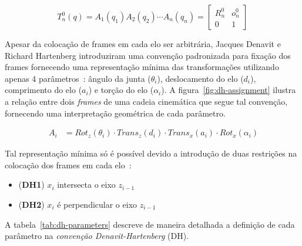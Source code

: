 \begin{equation}\label{eq:fkine}
    T^0_n(q) = A_1(q_1) A_2(q_2) \cdots A_n(q_n) = \begin{bmatrix}
        R^0_n & o^0_n \\
        0     & 1
    \end{bmatrix}
\end{equation}

Apesar da colocação de frames em cada elo ser arbitrária, Jacques Denavit e Richard Hartenberg
introduziram uma convenção padronizada para fixação dos frames fornecendo uma representação mínima das transformações 
utilizando apenas 4 parâmetros~\cite{denavit1955}: ângulo da junta  (\(\theta_i\)), deslocamento do elo (\(d_i\)), comprimento do elo (\(a_i\)) e 
torção do elo (\(\alpha_i\)). A figura~\ref{fig:dh-assignment} ilustra a relação entre dois \emph{frames} de uma cadeia cinemática que segue tal convenção, 
fornecendo uma interpretação geométrica de cada parâmetro.

\begin{align}~\label{eq:dh-matrix}
    A_i & = Rot_z(\theta_i) \cdot Trans_z(d_i) \cdot Trans_x(a_i) \cdot Rot_x(\alpha_i)             
\end{align}

Tal representação mínima só é possível devido a introdução de 
duas restrições na colocação dos frames em cada elo~\cite{spong_robot_2020}:

\begin{itemize}
    \item (\textbf{DH1}) $x_i$ intersecta o eixo $z_{i-1}$
    \item (\textbf{DH2}) $x_i$ é perpendicular o eixo $z_{i-1}$
\end{itemize}

A tabela~\ref{tab:dh-parameters} descreve de maneira detalhada
a definição de cada parâmetro na \emph{convenção Denavit-Hartenberg} (DH).

